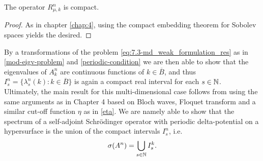 \begin{theorem}
	The operator $R_{\mu, k}^{n}$ is compact.	

	\begin{proof}
		As in chapter \ref{chap:4}, using the compact embedding theorem for Sobolev spaces yields the desired. %
	\end{proof}
\end{theorem}

By a transformations of the problem \eqref{eq:7.3-md_weak_formulation_res} as in \eqref{mod-eigv-problem} and \eqref{periodic-condition} we are then able to show that the eigenvalues of $A^{n}_{k}$ are continuous functions of $k \in \overline{B}$, and thus $I^{n}_{s} = \{ \lambda^{n}_{s}(k) : k \in \overline{B} \}$ is again a compact real interval for each $s \in \mathbb{N}$.  %
~\newline ~\newline
Ultimately, the main result for this multi-dimensional case follows from using the same arguments as in Chapter 4 based on Bloch waves, Floquet transform and a similar cut-off function $\eta$ as in \eqref{eta}. We are namely able to show that the spectrum of a self-adjoint Schrödinger operator with periodic delta-potential on a hypersurface is the union of the  compact intervals $I^{n}_{s}$, i.e.
	\[ \sigma(A^{n}) = \bigcup_{s \in \mathbb{N}} I^{k}_{s}. \]